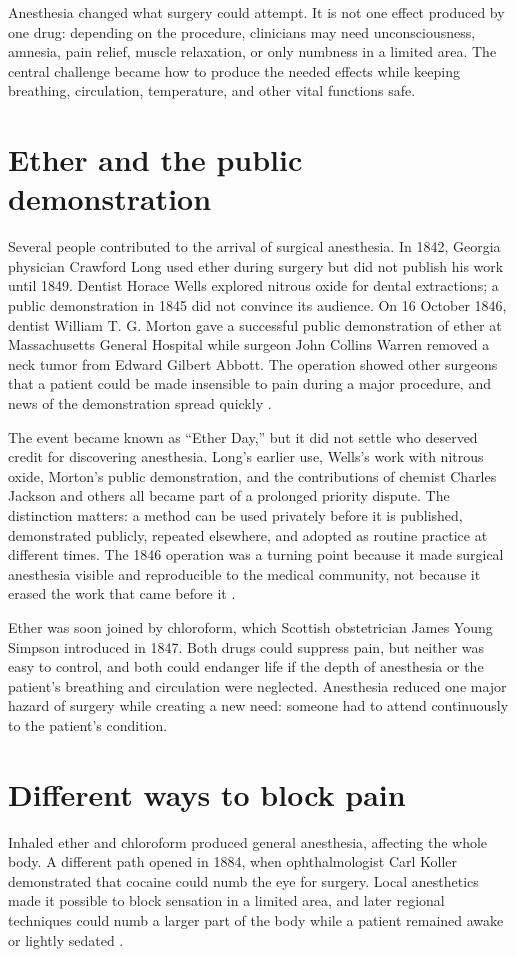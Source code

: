 \documentclass[12pt,oneside]{book}
\begin{document}
Anesthesia changed what surgery could attempt. It is not one effect produced
by one drug: depending on the procedure, clinicians may need unconsciousness,
amnesia, pain relief, muscle relaxation, or only numbness in a limited area.
The central challenge became how to produce the needed effects while keeping
breathing, circulation, temperature, and other vital functions safe.

\section{Ether and the public demonstration}
Several people contributed to the arrival of surgical anesthesia. In 1842,
Georgia physician Crawford Long used ether during surgery but did not publish
his work until 1849. Dentist Horace Wells explored nitrous oxide for dental
extractions; a public demonstration in 1845 did not convince its audience.
On 16 October 1846, dentist William T. G. Morton gave a successful public
demonstration of ether at Massachusetts General Hospital while surgeon John
Collins Warren removed a neck tumor from Edward Gilbert Abbott. The operation
showed other surgeons that a patient could be made insensible to pain during a
major procedure, and news of the demonstration spread quickly
\cite{wlmanesthesia,mghether}.

The event became known as ``Ether Day,'' but it did not settle who deserved
credit for discovering anesthesia. Long's earlier use, Wells's work with
nitrous oxide, Morton's public demonstration, and the contributions of
chemist Charles Jackson and others all became part of a prolonged priority
dispute. The distinction matters: a method can be used privately before it is
published, demonstrated publicly, repeated elsewhere, and adopted as routine
practice at different times. The 1846 operation was a turning point because it
made surgical anesthesia visible and reproducible to the medical community,
not because it erased the work that came before it \cite{wlmanesthesia}.

Ether was soon joined by chloroform, which Scottish obstetrician James Young
Simpson introduced in 1847. Both drugs could suppress pain, but neither was
easy to control, and both could endanger life if the depth of anesthesia or
the patient's breathing and circulation were neglected. Anesthesia reduced
one major hazard of surgery while creating a new need: someone had to attend
continuously to the patient's condition.

\section{Different ways to block pain}
Inhaled ether and chloroform produced general anesthesia, affecting the whole
body. A different path opened in 1884, when ophthalmologist Carl Koller
demonstrated that cocaine could numb the eye for surgery. Local anesthetics
made it possible to block sensation in a limited area, and later regional
techniques could numb a larger part of the body while a patient remained
awake or lightly sedated \cite{kollerlocal}.
\end{document}
